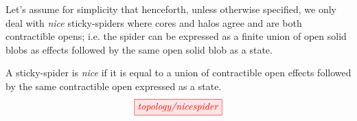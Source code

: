 Let's assume for simplicity that henceforth, unless otherwise specified, we only deal with \emph{nice} sticky-spiders where cores and halos agree and are both contractible opens; i.e. the spider can be expressed as a finite union of open solid blobs as effects followed by the same open solid blob as a state.

\begin{defn}
A sticky-spider is \emph{nice} if it is equal to a union of contractible open effects followed by the same contractible open expressed as a state.
\[\tikzfig{topology/nicespider}\]
\end{defn}